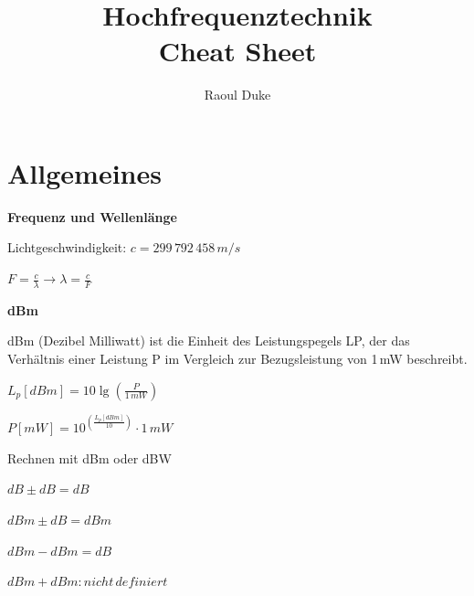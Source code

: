 \documentclass[german]{latex4ei/latex4ei_sheet}
\title{Hochfrequenztechnik \\ Cheat Sheet}
\author{Raoul Duke}
\begin{document}
\maketitle
\section{Allgemeines}
    \begin{sectionbox}{\textbf{Frequenz und Wellenlänge}}
        \item Lichtgeschwindigkeit: $c = 299\,792\,458\,m/s$
        \item $F = \frac{c}{\lambda} \rightarrow \lambda = \frac{c}{F}$
    \end{sectionbox}
    \begin{sectionbox}{\textbf{dBm}}
        \item dBm (Dezibel Milliwatt) ist die Einheit des Leistungspegels LP, der das Verhältnis einer Leistung P im Vergleich zur Bezugsleistung von 1\,mW beschreibt. 
        \item $L_p[dBm] = 10\lg\left(\frac{P}{1\,mW}\right)$
        \item $P[mW] = 10^{\left(\frac{L_p[dBm]}{10}\right)}\cdot 1\,mW$
        \item \begin{symbolbox} {Rechnen mit dBm oder dBW}
            \item $dB \pm dB = dB$
            \item $dBm \pm dB = dBm$
            \item $dBm - dBm = dB$
            \item $dBm + dBm : nicht\, definiert$
        \end{symbolbox}
    \end{sectionbox}
\end{document}
